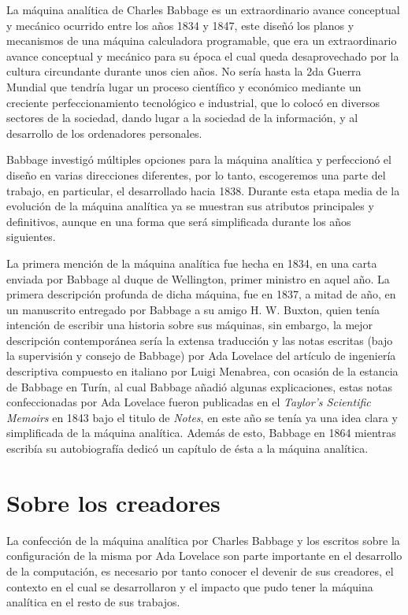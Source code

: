 \documentclass[runningheads,a4paper]{llncs}
\begin{document}
La máquina analítica de Charles Babbage es un extraordinario avance conceptual y mecánico ocurrido
entre los años 1834 y 1847, este diseñó los planos y mecanismos de una máquina calculadora programable, 
que era un extraordinario avance conceptual y mecánico para su época el cual queda desaprovechado
por la cultura circundante durante unos cien años. No sería hasta la 2da Guerra Mundial que tendría lugar
un proceso científico y económico mediante un creciente perfeccionamiento tecnológico e industrial, 
que lo colocó en diversos sectores de la sociedad, dando lugar a la sociedad de la información, y al desarrollo de los ordenadores personales.

Babbage investigó múltiples opciones para la máquina analítica y perfeccionó el diseño en varias direcciones
diferentes, por lo tanto, escogeremos una parte del trabajo, en particular, el desarrollado hacia 1838. 
Durante esta etapa media de la evolución de la máquina analítica ya se muestran sus atributos principales 
y definitivos, aunque en una forma que será simplificada durante los años siguientes.

La primera mención de la máquina analítica fue hecha en 1834, en una carta enviada por Babbage al 
duque de Wellington, primer ministro en aquel año. La primera descripción profunda de dicha máquina, 
fue en 1837, a mitad de año, en un manuscrito entregado por Babbage a su amigo H. W. Buxton, quien 
tenía intención de escribir una historia sobre sus máquinas, sin embargo, la mejor descripción contemporánea 
sería la extensa traducción y las notas escritas (bajo la supervisión y consejo de Babbage) por Ada 
Lovelace del artículo de ingeniería descriptiva compuesto en italiano por Luigi Menabrea, con ocasión 
de la estancia de Babbage en Turín, al cual Babbage añadió algunas explicaciones, estas notas confeccionadas 
por Ada Lovelace fueron publicadas en el \emph{Taylor’s Scientific Memoirs} en 1843 bajo el titulo de 
\emph{Notes}, en este año se tenía ya una idea clara y simplificada de la máquina analítica. 
Además de esto, Babbage en 1864 mientras escribía su autobiografía dedicó un capítulo de ésta a la 
máquina analítica.

\section{Sobre los creadores}

La confección de la máquina analítica por Charles Babbage y los escritos sobre la configuración de la misma por Ada Lovelace son parte importante en el desarrollo de la computación, es necesario por tanto conocer el devenir de sus creadores, el contexto en el cual se desarrollaron y el impacto que pudo tener la máquina analítica en el resto de
sus trabajos.
\end{document}
